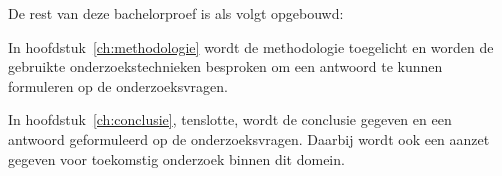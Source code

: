 De rest van deze bachelorproef is als volgt opgebouwd:

In hoofdstuk~\ref{ch:methodologie} wordt de methodologie toegelicht en worden de gebruikte onderzoekstechnieken besproken om een antwoord te kunnen formuleren op de onderzoeksvragen.


In hoofdstuk~\ref{ch:conclusie}, tenslotte, wordt de conclusie gegeven en een antwoord geformuleerd op de onderzoeksvragen. Daarbij wordt ook een aanzet gegeven voor toekomstig onderzoek binnen dit domein.

